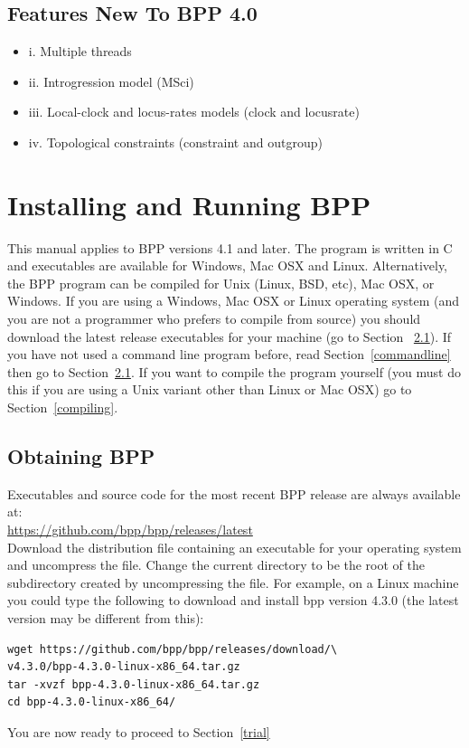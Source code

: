 \documentclass{book}
\numberwithin{equation}{section} \renewcommand{\baselinestretch}{0.55}
\begin{document}
\section{Features New To BPP 4.0}

\begin{itemize}
\item i.  Multiple threads
\item ii.  Introgression model (MSci)
\item iii. Local-clock and locus-rates models (clock and locusrate)
\item iv.  Topological constraints (constraint and outgroup)
\end{itemize}

\chapter{Installing and Running BPP}

This manual applies to \textsc{BPP} versions 4.1 and later.  The
program is written in C and executables are available for Windows, Mac
OSX and Linux. Alternatively, the \textsc{BPP} program can be compiled
for Unix (Linux, BSD, etc), Mac OSX, or Windows. If you are using a
Windows, Mac OSX or Linux operating system (and you are not a
programmer who prefers to compile from source) you should download the
latest release executables for your machine (go to Section
~\ref{download}). If you have not used a command line program before,
read Section~\ref{commandline} then go to Section~\ref{download}. If
you want to compile the program yourself (you must do this if you are
using a Unix variant other than Linux or Mac OSX) go to
Section~\ref{compiling}.

\section{Obtaining BPP}\label{download}
Executables and source code for the most recent \textsc{BPP} release
are always available at:
\newline \noindent \vspace{0.1pt} \\
\href{https://github.com/bpp/bpp/releases/latest}{https://github.com/bpp/bpp/releases/latest}
\newline \noindent \vspace{0.1pt} \\
Download the distribution file containing an executable for your
operating system and uncompress the file. Change the current directory
to be the root of the subdirectory created by uncompressing the file.
For example, on a Linux machine you could type the following to
download and install bpp version 4.3.0 (the latest version may be
different from this):
\begin{verbatim}
wget https://github.com/bpp/bpp/releases/download/\
v4.3.0/bpp-4.3.0-linux-x86_64.tar.gz
tar -xvzf bpp-4.3.0-linux-x86_64.tar.gz
cd bpp-4.3.0-linux-x86_64/
\end{verbatim}
\noindent
You are now ready to proceed to Section~\ref{trial}
\end{document}
